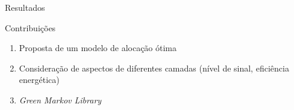 \begin{frame}{Resultados}
  \begin{block}{Contribuições}
    \begin{enumerate}
      \item Proposta de um modelo de alocação ótima
      \item Consideração de aspectos de diferentes camadas (nível de sinal,
      eficiência energética)
      \item \textit{Green Markov Library}
    \end{enumerate}
  \end{block}
\end{frame}





